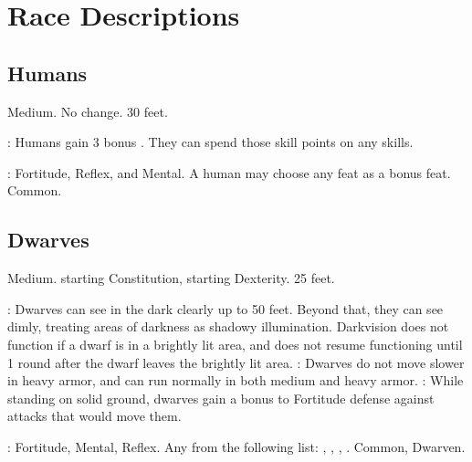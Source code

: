 \section{Race Descriptions}

\subsection{Humans}
 Medium.
 No change.
 30 feet.
\begin{itemize}
    : Humans gain 3 bonus . They can spend those skill points on any skills.
\end{itemize}
:  Fortitude, Reflex, and Mental.
 A human may choose any feat as a bonus feat.
 Common.

\subsection{Dwarves}
 Medium.
  starting Constitution,  starting Dexterity.
 25 feet.
\begin{itemize}
    : Dwarves can see in the dark clearly up to 50 feet.   Beyond that, they can see dimly, treating areas of darkness as shadowy illumination. Darkvision does not function if a dwarf is in a brightly lit area, and does not resume functioning until 1 round after the dwarf leaves the brightly lit area.
    : Dwarves do not move slower in heavy armor, and can run normally in both medium and heavy armor.
    : While standing on solid ground, dwarves gain a  bonus to Fortitude defense against attacks that would move them.
\end{itemize}
:  Fortitude,  Mental,  Reflex.
 Any from the following list: , , , .
 Common, Dwarven.

